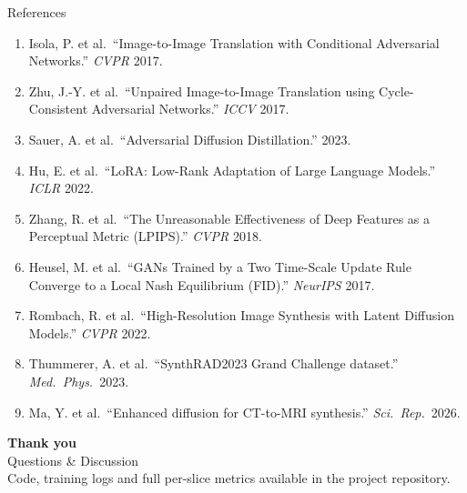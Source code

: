 \documentclass[aspectratio=169,10pt]{beamer}
\begin{document}
\begin{frame}{References}
\scriptsize
\begin{enumerate}
    \item Isola, P. et al.\ ``Image-to-Image Translation with Conditional Adversarial Networks.'' \emph{CVPR} 2017.
    \item Zhu, J.-Y. et al.\ ``Unpaired Image-to-Image Translation using Cycle-Consistent Adversarial Networks.'' \emph{ICCV} 2017.
    \item Sauer, A. et al.\ ``Adversarial Diffusion Distillation.'' 2023.
    \item Hu, E. et al.\ ``LoRA: Low-Rank Adaptation of Large Language Models.'' \emph{ICLR} 2022.
    \item Zhang, R. et al.\ ``The Unreasonable Effectiveness of Deep Features as a Perceptual Metric (LPIPS).'' \emph{CVPR} 2018.
    \item Heusel, M. et al.\ ``GANs Trained by a Two Time-Scale Update Rule Converge to a Local Nash Equilibrium (FID).'' \emph{NeurIPS} 2017.
    \item Rombach, R. et al.\ ``High-Resolution Image Synthesis with Latent Diffusion Models.'' \emph{CVPR} 2022.
    \item Thummerer, A. et al.\ ``SynthRAD2023 Grand Challenge dataset.'' \emph{Med.\ Phys.}\ 2023.
    \item Ma, Y. et al.\ ``Enhanced diffusion for CT-to-MRI synthesis.'' \emph{Sci.\ Rep.}\ 2026.
\end{enumerate}
\end{frame}


\begin{frame}
\centering
\vfill
{\Huge\color{brand}\textbf{Thank you}}\\[6pt]
{\large Questions \& Discussion}\\[18pt]
{\footnotesize\color{rule} Code, training logs and full per-slice metrics available in the project repository.}
\vfill
\end{frame}
\end{document}
